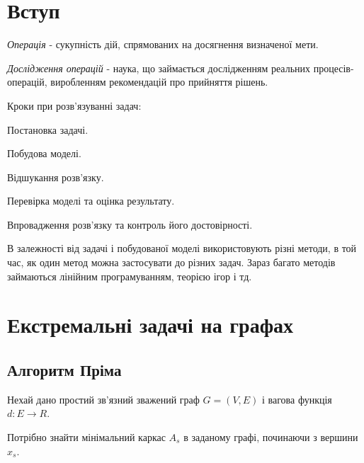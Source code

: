 \documentclass[12pt,a4paper]{book}
\newenvironment{slim_enumerate}{
\begin{enumerate}
  \setlength{\itemsep}{1pt}
  \setlength{\parskip}{0pt}
  \setlength{\parsep}{0pt}}
{\end{enumerate}}
\begin{document}
\tableofcontents

\chapter{Вступ}

\emph{Операція} - сукупність дій, спрямованих на досягнення визначеної мети.

\emph{Дослідження операцій} - наука, що займається дослідженням реальних процесів-операцій, виробленням рекомендацій про прийняття рішень.

Кроки при розв'язуванні задач:
\begin{slim_enumerate}
  \item Постановка задачі.
  \item Побудова моделі.
  \item Відшукання розв'язку.
  \item Перевірка моделі та оцінка результату.
  \item Впровадження розв'язку та контроль його достовірності.
\end{slim_enumerate}

В залежності від задачі і побудованої моделі використовують різні методи, в той час, як один метод можна застосувати до різних задач. Зараз багато методів займаються лінійним програмуванням, теорією ігор і тд.

\chapter{Екстремальні задачі на графах}

\section{Алгоритм Пріма}

Нехай дано простий зв’язний зважений граф $G=(V,E)$ і вагова функція $d:E\rightarrow R$.

Потрібно знайти мінімальний каркас $A_s$ в заданому графі, починаючи з вершини $x_s$.
\end{document}
